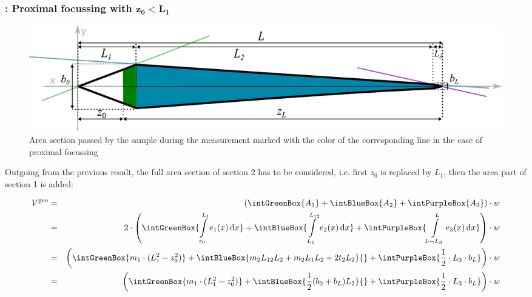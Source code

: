 \subsubsection*{\Vgeo: Proximal focussing with $\bm{z_0 < L_1}$}
\begin{figure}[h]
  \begin{center}
    \includegraphics[width=0.95\linewidth]{./images/fffVolume2.pdf}    
  \end{center}
  \vspace*{-3ex}    
  \caption[Passed area section - proximal focussing]{Area section passed by the sample during the measurement marked 
  with the color of the corresponding line in the case of proximal focussing}
  \label{fig:fffVolume2} 
\end{figure}
Outgoing from the previous result, the full area section of section 2 has to be considered, i.e. first $z_0$ is 
replaced by $L_1$, then the area part of section 1 is added:

\begin{align}
  \Vgeo & = &\left( \intGreenBox{\ensuremath{A_1}} +  \intBlueBox{\ensuremath{A_2}} + \intPurpleBox{\ensuremath{A_3}}\right) \cdot w\nonumber \\  
        & =&2 \cdot \left(
             \intGreenBox {\ensuremath{ \int\limits_{z_0}^{L_{1}} e_1(x) \diff x }}
             + \intBlueBox {\ensuremath{ \int\limits_{L_1}^{L_{12}} e_2(x) \diff x }}
             + \intPurpleBox{\ensuremath{  \int\limits_{L-L_3}^{L} e_3(x) \diff x }}    
             \right) \cdot w \nonumber \\
        &  =&\left(
              \intGreenBox {\ensuremath{ m_1 \cdot ( L_1^2 - z_0^2) }}
              + \intBlueBox{\ensuremath{ m_2L_{12}L_2 + m_2L_1L_2 + 2t_2L_2}}{ }
              + \intPurpleBox{\ensuremath{ \frac{1}{2} \cdot L_3 \cdot \bL  } }
              \right) \cdot w   \nonumber\\
        &  =&\left(
              \intGreenBox {\ensuremath{ m_1 \cdot ( L_1^2 - z_0^2) }}
              + \intBlueBox{\ensuremath{   \frac{1}{2} (b_0 + b_L) L_2  }  }{ }
              + \intPurpleBox{\ensuremath{ \frac{1}{2} \cdot L_3 \cdot \bL  } }
              \right) \cdot w         
              \label{eq:proxFocusVolume}
\end{align}